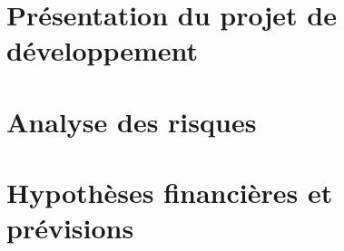 \documentclass[a4paper,12pt]{report}
\begin{document}
\section{Présentation du projet de développement}
\section{Analyse des risques}
\section{Hypothèses financières et prévisions}
\end{document}
